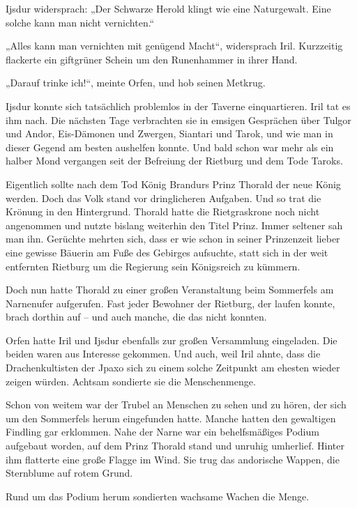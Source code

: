 Ijsdur widersprach: „Der Schwarze Herold klingt wie eine Naturgewalt. Eine solche kann man nicht vernichten.“

„Alles kann man vernichten mit genügend Macht“, widersprach Iril. Kurzzeitig flackerte ein giftgrüner Schein um den Runenhammer in ihrer Hand.

„Darauf trinke ich!“, meinte Orfen, und hob seinen Metkrug.



\trennzeichen



Ijsdur konnte sich tatsächlich problemlos in der Taverne einquartieren. Iril tat es ihm nach. Die nächsten Tage verbrachten sie in emsigen Gesprächen über Tulgor und Andor, Eis-Dämonen und Zwergen, Siantari und Tarok, und wie man in dieser Gegend am besten aushelfen konnte. Und bald schon war mehr als ein halber Mond vergangen seit der Befreiung der Rietburg und dem Tode Taroks.

Eigentlich sollte nach dem Tod König Brandurs Prinz Thorald der neue König werden. Doch das Volk stand vor dringlicheren Aufgaben. Und so trat die Krönung in den Hintergrund. Thorald hatte die Rietgraskrone noch nicht angenommen und nutzte bislang weiterhin den Titel Prinz. Immer seltener sah man ihn. Gerüchte mehrten sich, dass er wie schon in seiner Prinzenzeit lieber eine gewisse Bäuerin am Fuße des Gebirges aufsuchte, statt sich in der weit entfernten Rietburg um die Regierung sein Königsreich zu kümmern.

Doch nun hatte Thorald zu einer großen Veranstaltung beim Sommerfels am Narnenufer aufgerufen. Fast jeder Bewohner der Rietburg, der laufen konnte, brach dorthin auf – und auch manche, die das nicht konnten.

Orfen hatte Iril und Ijsdur ebenfalls zur großen Versammlung eingeladen. Die beiden waren aus Interesse gekommen. Und auch, weil Iril ahnte, dass die Drachenkultisten der Jpaxo sich zu einem solche Zeitpunkt am ehesten wieder zeigen würden. Achtsam sondierte sie die Menschenmenge.

Schon von weitem war der Trubel an Menschen zu sehen und zu hören, der sich um den Sommerfels herum eingefunden hatte. Manche hatten den gewaltigen Findling gar erklommen. Nahe der Narne war ein behelfsmäßiges Podium aufgebaut worden, auf dem Prinz Thorald stand und unruhig umherlief. Hinter ihm flatterte eine große Flagge im Wind. Sie trug das andorische Wappen, die Sternblume auf rotem Grund.

Rund um das Podium herum sondierten wachsame Wachen die Menge.

